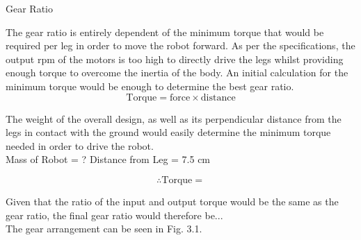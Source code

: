\begin{homeworkProblem}
\begin{homeworkSection}{Gear Ratio}

The gear ratio is entirely dependent of the minimum torque that would be required per leg in order to move the robot forward. As per the specifications, the output rpm of the motors is too high to directly drive the legs whilst providing enough torque to overcome the inertia of the body. An initial calculation for the minimum torque would be enough to determine the best gear ratio.\\

\begin{equation}
  \text{Torque} = \text{force}\times\text{distance}
\end{equation}

The weight of the overall design, as well as its perpendicular distance from the legs in contact with the ground would easily determine the minimum torque needed in order to drive the robot. \\

Mass of Robot = ?
Distance from Leg = 7.5 cm

\begin{equation*}
  \therefore \text{Torque} = 
\end{equation*}

Given that the ratio of the input and output torque would be the same as the gear ratio, the final gear ratio would therefore be...\\

The gear arrangement can be seen in Fig. 3.1. 

\end{homeworkSection}
\end{homeworkProblem}




